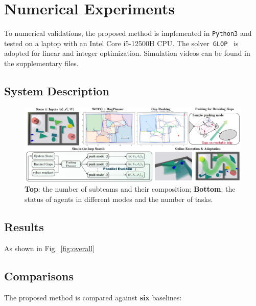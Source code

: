 \section{Numerical Experiments} \label{sec:experiments}
To numerical validations, the proposed method is implemented in \texttt{Python3}
and tested on a laptop with an Intel Core i5-12500H CPU.
The solver~\texttt{GLOP}~\cite{glop} is adopted for linear and integer optimization.
Simulation videos can be found in the supplementary files.

\subsection{System Description}\label{subsec:description}


\begin{figure}[t]
    \centering
    \includegraphics[width=0.97\hsize]{figures/overall.png}
    \vspace{-0.1in}
    \caption{\textbf{Top}: the number of subteams and their
      composition;
      \textbf{Bottom}: the status of agents in different modes
      and the number of tasks.
    }\label{fig:subteam}
    \vspace{-0.2in}
  \end{figure}


\subsection{Results}\label{subsec:results}
As shown in Fig.~\ref{fig:overall}


\subsection{Comparisons}\label{subsec:comparisons}
The proposed method is compared against \textbf{{six}} baselines:


